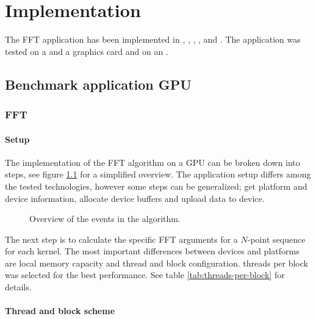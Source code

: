 \chapter{Implementation}\label{cha:implementation}

The \gls{FFT} application has been implemented in {\CPP}, {\CU}, {\OCL}, {\DX}, and {\GL}. The application was tested on a {\NVCARD} and a {\AMDCARD} graphics card and on an {\INTELCPU}.

\section{Benchmark application GPU}

\subsection{FFT}

\subsubsection{Setup}

The implementation of the \gls{FFT} algorithm on a \gls{GPU} can be broken down into steps, see figure \ref{fig:algorithm-overview} for a simplified overview. The application setup differs among the tested technologies, however some steps can be generalized; get platform and device information, allocate device buffers and upload data to device.
\begin{figure}
	\centering
	
	\caption{Overview of the events in the algorithm.}
	\label{fig:algorithm-overview}
\end{figure}

The next step is to calculate the specific \gls{FFT} arguments for a $N$-point sequence for each \gls{kernel}. The most important differences between devices and platforms are local memory capacity and thread and block configuration. \Glspl{thread} per block was selected for the best performance. See table \ref{tab:threads-per-block} for details.
\begin{table}
	\centering
	
	\caption{Shared memory size in bytes, threads and block configuration per device.}
	\label{tab:threads-per-block}
\end{table}

\subsubsection{Thread and block scheme}

